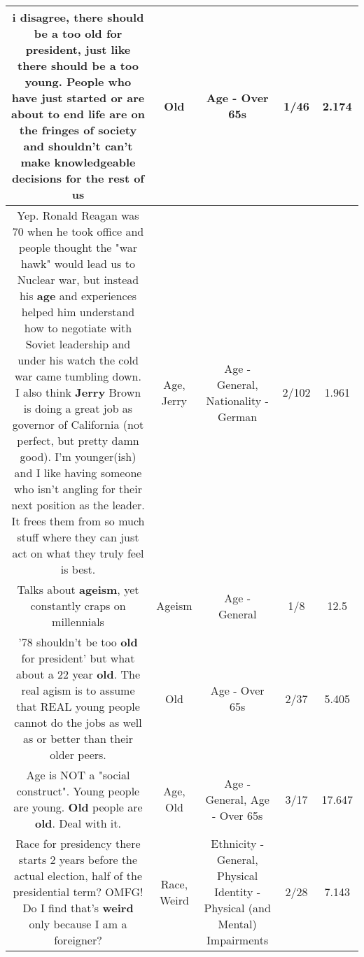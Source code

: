 \documentclass[11pt]{article}
\newlength\mylength
\begin{document}
\begin{center}
\begin{longtable}{|C{.65\mylength}|C{.30\mylength}|C{.12\mylength}|C{.12\mylength}|C{.12\mylength}|}
  \small i disagree, there should be a too \textbf{old} for president, just like there should be a too young. People who have just started or are about to end life are on the fringes of society and shouldn't can't make knowledgeable decisions for the rest of us\normalsize   & Old & Age - Over 65s & 1/46 & 2.174 \\  \hline
  \small Yep. Ronald Reagan was 70 when he took office and people thought the "war hawk" would lead us to Nuclear war, but instead his \textbf{age} and experiences helped him understand how to negotiate with Soviet leadership and under his watch the cold war came tumbling down. I also think \textbf{Jerry} Brown is doing a great job as governor of California (not perfect, but pretty damn good).  I'm younger(ish) and I like having someone who isn't angling for their next position as the leader. It frees them from so much stuff where they can just act on what they truly feel is best.\normalsize   & Age, Jerry & Age - General, Nationality - German & 2/102 & 1.961 \\  \hline
  \small Talks about \textbf{ageism}, yet constantly craps on millennials\normalsize   & Ageism & Age - General & 1/8 & 12.5 \\  \hline
  \small '78 shouldn't be too \textbf{old} for president' but what about a 22 year \textbf{old}. The real agism is to assume that REAL young people cannot do the jobs as well as or better than their older peers.\normalsize   & Old & Age - Over 65s & 2/37 & 5.405 \\  \hline
  \small Age is NOT a "social construct". Young people are young. \textbf{Old} people are \textbf{old}. Deal with it.\normalsize   & Age, Old & Age - General, Age - Over 65s & 3/17 & 17.647 \\  \hline
  \small Race for presidency there starts 2 years before the actual election, half of the presidential term? OMFG! Do I find that's \textbf{weird} only because I am a foreigner?\normalsize   & Race, Weird & Ethnicity - General, Physical Identity - Physical (and Mental) Impairments & 2/28 & 7.143 \\  \hline

\end{longtable}
\end{center}
\end{document}
